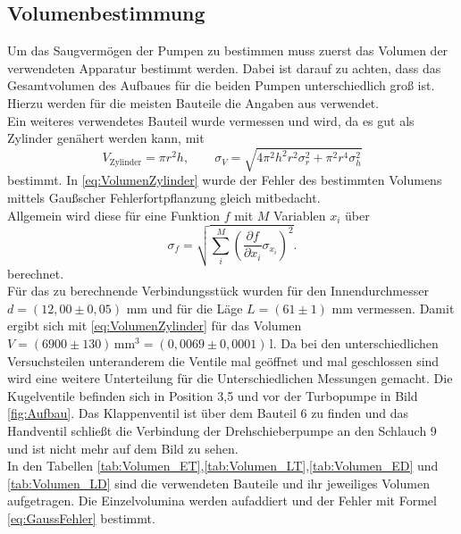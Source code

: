 \subsection{Volumenbestimmung}
Um das Saugvermögen der Pumpen zu bestimmen muss zuerst das Volumen der verwendeten Apparatur bestimmt werden. Dabei ist
darauf zu achten, dass das Gesamtvolumen des Aufbaues für die beiden Pumpen unterschiedlich groß ist.\\
Hierzu werden für die meisten Bauteile die Angaben aus \cite{Anleitung} verwendet.\\
Ein weiteres verwendetes Bauteil wurde vermessen und wird, da es gut als Zylinder genähert werden kann, mit
\begin{equation}
  V_{\text{Zylinder}}=\pi r^2 h, \qquad \sigma_{V}=\sqrt{4 \pi^{2} h^{2} r^{2} \sigma_{r}^{2}  + \pi^{2} r^{4} \sigma_{h}^{2} }
\label{eq:VolumenZylinder}
\end{equation}
bestimmt. In \ref{eq:VolumenZylinder} wurde der Fehler des bestimmten Volumens mittels Gaußscher Fehlerfortpflanzung gleich mitbedacht.\\
Allgemein wird diese für eine Funktion $f$ mit $M$ Variablen $x_i$ über
\begin{equation}
  \label{eq:GaussFehler}
  \sigma_f= \sqrt{ \sum_i^M \left(\frac{\partial f}{\partial x_i} \sigma_{x_i}\right)^2}.
\end{equation}
berechnet.\\
Für das zu berechnende Verbindungsstück wurden für den Innendurchmesser $d=(12,00 \pm 0,05)$ mm und für die Läge $L=(61\pm 1)$ mm vermessen.
Damit ergibt sich mit \ref{eq:VolumenZylinder} für das Volumen $V=(6900 \pm 130)\,\text{mm}^3 = (0,0069 \pm 0,0001)$\,l.
Da bei den unterschiedlichen Versuchsteilen unteranderem die Ventile mal geöffnet und mal geschlossen sind wird eine weitere Unterteilung
für die Unterschiedlichen Messungen gemacht. Die Kugelventile befinden sich in Position 3,5 und vor der Turbopumpe in Bild \ref{fig:Aufbau}.
Das Klappenventil ist über dem Bauteil 6 zu finden und das Handventil schließt die Verbindung der Drehschieberpumpe an den Schlauch 9 und ist nicht mehr
auf dem Bild zu sehen.\\
In den Tabellen \ref{tab:Volumen_ET},\ref{tab:Volumen_LT},\ref{tab:Volumen_ED} und \ref{tab:Volumen_LD} sind die verwendeten Bauteile
 und ihr jeweiliges Volumen aufgetragen.
Die Einzelvolumina werden aufaddiert und der Fehler mit Formel \ref{eq:GaussFehler} bestimmt.


